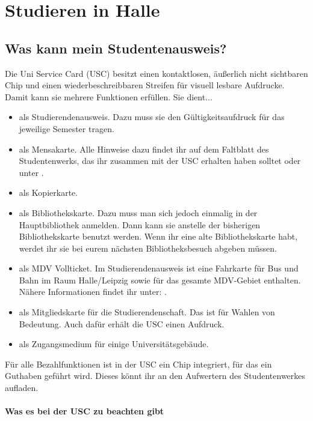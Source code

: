 
\section{Studieren in Halle}

\subsection{Was kann mein Studentenausweis?}
Die Uni Service Card (USC) besitzt einen kontaktlosen, äußerlich nicht sichtbaren Chip und einen wiederbeschreibbaren Streifen für visuell lesbare Aufdrucke.
Damit kann sie mehrere Funktionen erfüllen. Sie dient...

\begin{itemize}
 \item als Studierendenausweis.
       Dazu muss sie den Gültigkeitsaufdruck für das jeweilige Semester tragen.
 \item als Mensakarte.
       Alle Hinweise dazu findet ihr auf dem Faltblatt des Studentenwerks, das ihr zusammen mit der USC erhalten haben solltet
       oder unter .
 \item als Kopierkarte.
 \item als Bibliothekskarte.
       Dazu muss man sich jedoch einmalig in der Hauptbibliothek anmelden.
       Dann kann sie anstelle der bisherigen Bibliothekskarte benutzt werden.
       Wenn ihr eine alte Bibliothekskarte habt, werdet ihr sie bei eurem nächsten Bibliotheksbesuch abgeben müssen.
 \item als MDV Vollticket.
       Im Studierendenausweis ist eine Fahrkarte für Bus und Bahn im Raum Halle/Leipzig sowie für das gesamte MDV-Gebiet enthalten. Nähere Informationen findet ihr unter: .
 \item als Mitgliedskarte für die Studierendenschaft.
       Das ist für Wahlen von Bedeutung.
       Auch dafür erhält die USC einen Aufdruck.
 \item als Zugangsmedium für einige Universitätsgebäude.
\end{itemize}

Für alle Bezahlfunktionen ist in der USC ein Chip integriert, für das ein Guthaben geführt wird.
Dieses könnt ihr an den Aufwertern des Studentenwerkes aufladen.

\clearpage %

\paragraph{Was es bei der USC zu beachten gibt}

